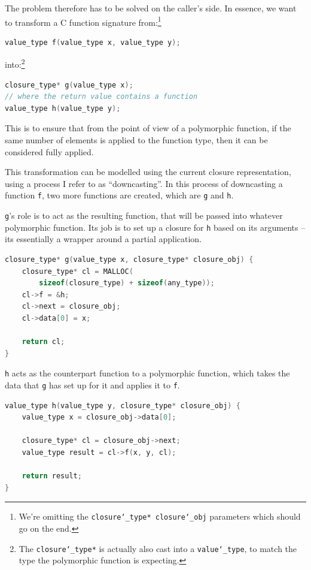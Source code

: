 \documentclass[12pt,a4paper,twoside,openright]{report}
\begin{document}
The problem therefore has to be solved on the caller's side. In essence, we 
want to transform a C function signature from:\footnote{We're omitting the 
\texttt{closure\char`_type* closure\char`_obj} parameters which should go 
on the end.}

\begin{lstlisting}[language=C]
value_type f(value_type x, value_type y);
\end{lstlisting}

into:\footnote{The \texttt{closure\char`_type*} is actually also cast into a 
\texttt{value\char`_type}, to match the type the polymorphic function is 
expecting.}

\begin{lstlisting}[language=C]
closure_type* g(value_type x);
// where the return value contains a function
value_type h(value_type y);
\end{lstlisting}

This is to ensure that from the point of view of a polymorphic function, if the 
same number of elements is applied to the function type, then it can be 
considered fully applied.

This transformation can be modelled using the current closure representation, 
using a process I refer to as ``downcasting''. In this process of downcasting a 
function \texttt{f}, two more functions are created, which are \texttt{g} and 
\texttt{h}.

\texttt{g}'s role is to act as the resulting function, that will be passed into 
whatever polymorphic function. Its job is to set up a closure for \texttt{h} 
based on its arguments -- its essentially a wrapper around a partial 
application.

\begin{lstlisting}[language=C]
closure_type* g(value_type x, closure_type* closure_obj) {
    closure_type* cl = MALLOC(
        sizeof(closure_type) + sizeof(any_type));
    cl->f = &h;
    cl->next = closure_obj;
    cl->data[0] = x;
    
    return cl;
}
\end{lstlisting}

\texttt{h} acts as the counterpart function to a polymorphic function, which 
takes the data that \texttt{g} has set up for it and applies it to \texttt{f}.

\begin{lstlisting}[language=C]
value_type h(value_type y, closure_type* closure_obj) {
    value_type x = closure_obj->data[0];
    
    closure_type* cl = closure_obj->next;
    value_type result = cl->f(x, y, cl);
    
    return result;
}
\end{lstlisting}
\end{document}
